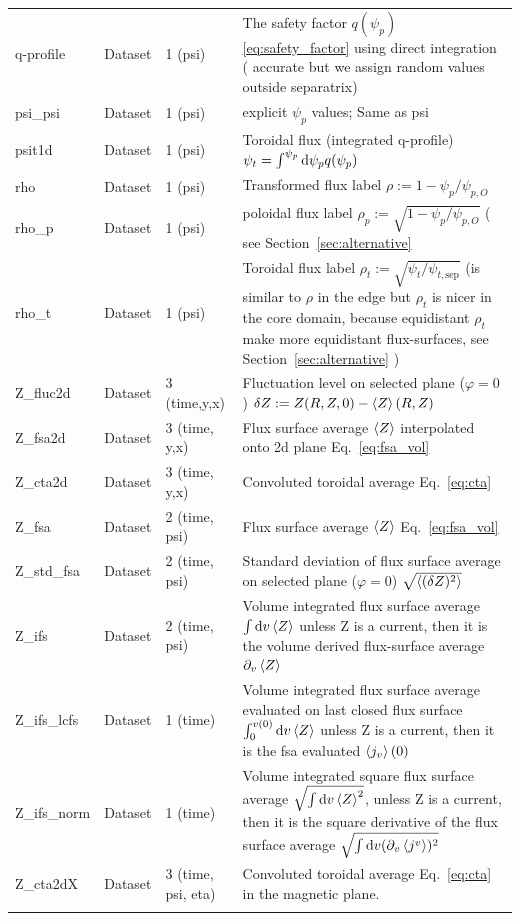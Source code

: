 \begin{longtable}{lll>{\RaggedRight}p{7cm}}
q-profile        & Dataset & 1 (psi) & The safety factor $q(\psi_p)$ \eqref{eq:safety_factor} using direct integration ( accurate but we assign random values outside separatrix) \\
psi\_psi         & Dataset & 1 (psi) & explicit $\psi_p$ values; Same as psi \\
psit1d           & Dataset & 1 (psi) & Toroidal flux (integrated q-profile) $\psi_t = \int^{\psi_p} \mathrm{d}\psi_p q(\psi_p)$ \\
rho              & Dataset & 1 (psi) & Transformed flux label $\rho:= 1 - \psi_p/\psi_{p,O}$ \\
rho\_p           & Dataset & 1 (psi) & poloidal flux label $\rho_p:= \sqrt{1 - \psi_p/\psi_{p,O}}$  ( see Section~\ref{sec:alternative}\\
    rho\_t           & Dataset & 1 (psi) & Toroidal flux label $\rho_t :=
    \sqrt{\psi_t/\psi_{t,\mathrm{sep}}}$ (is similar to $\rho$ in the edge but
    $\rho_t$ is nicer in the core domain, because equidistant $\rho_t$ make
more equidistant flux-surfaces, see Section~\ref{sec:alternative} )\\
Z\_fluc2d        & Dataset & 3 (time,y,x) & Fluctuation level on selected plane ($\varphi= 0$) $\delta Z := Z(R,Z,0) - \left \langle  Z \right \rangle(R,Z)$ \\
Z\_fsa2d         & Dataset & 3 (time, y,x) & Flux surface average $\left \langle  Z \right \rangle$ interpolated onto 2d plane Eq.~\eqref{eq:fsa_vol} \\
Z\_cta2d         & Dataset & 3 (time, y,x) & Convoluted toroidal average Eq.~\eqref{eq:cta} \\
Z\_fsa           & Dataset & 2 (time, psi) & Flux surface average $\left \langle  Z \right \rangle$ Eq.~\eqref{eq:fsa_vol} \\
Z\_std\_fsa      & Dataset & 2 (time, psi) & Standard deviation of flux surface average on selected plane ($\varphi=0$) $\sqrt{\left \langle (\delta Z)^2 \right \rangle}$ \\
Z\_ifs           & Dataset & 2 (time, psi) & Volume integrated flux surface average $\int\mathrm{d} v\left \langle  Z \right \rangle$ unless Z is a current, then it is the volume derived flux-surface average $\partial_v \left \langle  Z \right \rangle$ \\
Z\_ifs\_lcfs     & Dataset & 1 (time) & Volume integrated flux surface average evaluated on last closed flux surface $\int_0^{v(0)}\mathrm{d} v\left \langle  Z \right \rangle$ unless Z is a current, then it is the fsa evaluated $\left \langle  j_v \right \rangle(0)$ \\
Z\_ifs\_norm     & Dataset & 1 (time) & Volume integrated square flux surface average $\sqrt{\int \mathrm{d} v \left \langle Z \right \rangle^2}$, unless Z is a current, then it is the square derivative of the flux surface average $\sqrt{\int\mathrm{d} v (\partial_v \left \langle j^v \right \rangle)^2}$\\
Z\_cta2dX  & Dataset & 3 (time, psi, eta) & Convoluted toroidal average Eq.~\eqref{eq:cta} in the magnetic plane. \\
\bottomrule
\label{table:diag}
\end{longtable}
